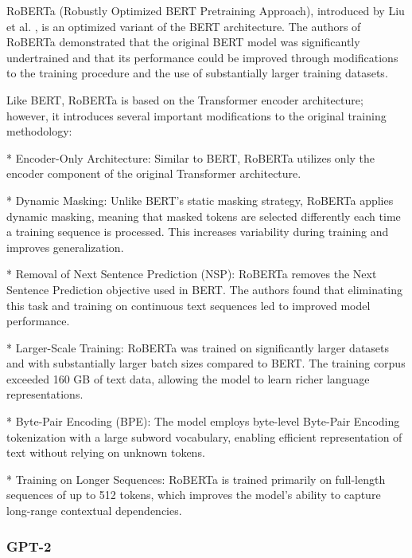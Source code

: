 \begin{markdown}

RoBERTa (Robustly Optimized BERT Pretraining Approach), introduced by Liu et al. \cite{liu_roberta_2019}, is an optimized variant of the BERT architecture. The authors of RoBERTa demonstrated that the original BERT model was significantly undertrained and that its performance could be improved through modifications to the training procedure and the use of substantially larger training datasets.

Like BERT, RoBERTa is based on the Transformer encoder architecture; however, it introduces several important modifications to the original training methodology:

* Encoder-Only Architecture: Similar to BERT, RoBERTa utilizes only the encoder component of the original Transformer architecture.

* Dynamic Masking: Unlike BERT’s static masking strategy, RoBERTa applies dynamic masking, meaning that masked tokens are selected differently each time a training sequence is processed. This increases variability during training and improves generalization.

* Removal of Next Sentence Prediction (NSP): RoBERTa removes the Next Sentence Prediction objective used in BERT. The authors found that eliminating this task and training on continuous text sequences led to improved model performance.

* Larger-Scale Training: RoBERTa was trained on significantly larger datasets and with substantially larger batch sizes compared to BERT. The training corpus exceeded 160 GB of text data, allowing the model to learn richer language representations.

* Byte-Pair Encoding (BPE): The model employs byte-level Byte-Pair Encoding tokenization with a large subword vocabulary, enabling efficient representation of text without relying on unknown tokens.

* Training on Longer Sequences: RoBERTa is trained primarily on full-length sequences of up to 512 tokens, which improves the model’s ability to capture long-range contextual dependencies.

\end{markdown}

\subsubsection{GPT-2}

